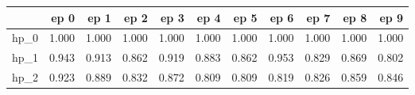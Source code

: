 \begin{tabular}{lrrrrrrrrrr}
\toprule
{} &   ep 0 &   ep 1 &   ep 2 &   ep 3 &   ep 4 &   ep 5 &   ep 6 &   ep 7 &   ep 8 &   ep 9 \\
\midrule
hp\_0 &  1.000 &  1.000 &  1.000 &  1.000 &  1.000 &  1.000 &  1.000 &  1.000 &  1.000 &  1.000 \\
hp\_1 &  0.943 &  0.913 &  0.862 &  0.919 &  0.883 &  0.862 &  0.953 &  0.829 &  0.869 &  0.802 \\
hp\_2 &  0.923 &  0.889 &  0.832 &  0.872 &  0.809 &  0.809 &  0.819 &  0.826 &  0.859 &  0.846 \\
\bottomrule
\end{tabular}
